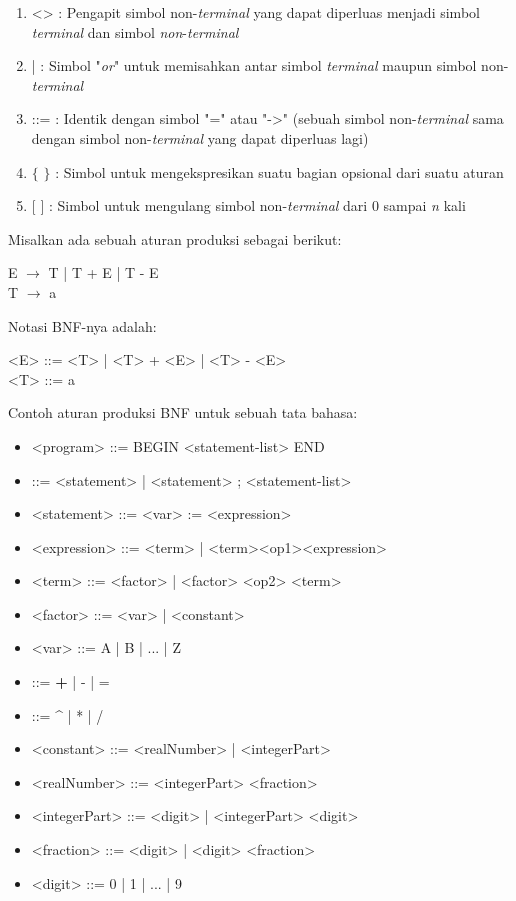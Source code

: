 \begin{enumerate}[1.]
\item <>			: Pengapit simbol non-\textit{terminal} yang dapat diperluas menjadi simbol \textit{terminal} dan simbol \textit{non}-\textit{terminal}
\item | 			: Simbol "\textit{or}" untuk memisahkan antar simbol \textit{terminal} maupun simbol non-\textit{terminal}
\item ::=			: Identik dengan simbol "=" atau "->" (sebuah simbol  non-\textit{terminal} sama dengan simbol non-\textit{terminal} yang dapat diperluas lagi)
\item $\big\{$ $\big\}$	: Simbol untuk mengekspresikan suatu bagian opsional dari suatu aturan 
\item $\big[$	$\big]$	: Simbol untuk mengulang simbol non-\textit{terminal} dari 0 sampai \textit{n} kali
\end{enumerate}

Misalkan ada sebuah aturan produksi sebagai berikut:

E $\rightarrow$ T | T + E | T - E
\\
T $\rightarrow$ a

Notasi BNF-nya adalah:

<E> ::= <T> | <T> + <E> | <T> - <E>
\\
<T> ::= a

Contoh aturan produksi BNF untuk sebuah tata bahasa:

\begin{itemize}

	\item <program>		::= BEGIN <statement-list> END
	\\
	\item <statement-list>	::= <statement> | <statement> ; <statement-list>
	\item <statement>		::= <var> := <expression>
	\item <expression>		::= <term> | <term><op1><expression>
	\item <term>		::= <factor> | <factor> <op2> <term>
	\item <factor>		::= <var> | <constant>
	\\
	\item <var>			::= A | B | ... | Z
	\item <op1>			::= \textbf{+} | - | =
	\item <op2> 		::=  \^{} | * | /
	\item <constant>		::= <realNumber> | <integerPart>
	\\
	\item <realNumber>	::= <integerPart> <fraction>
	\item <integerPart>	::= <digit> | <integerPart> <digit>
	\item <fraction>		::= <digit> | <digit> <fraction>
	\item <digit>			::= 0 | 1 | ... | 9
	
\end{itemize}

